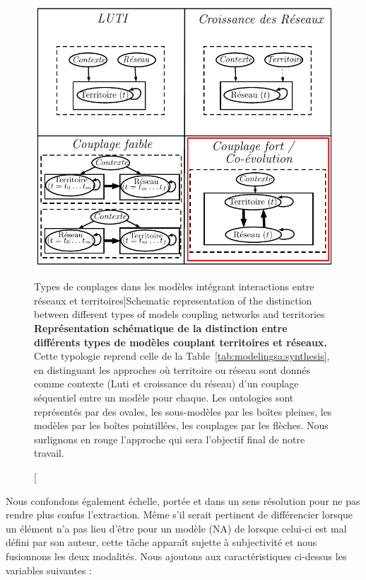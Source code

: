 \begin{figure}[h!]
\includegraphics[width=\linewidth]{Figures/Modelography/coevolution_fr.pdf}
\caption[Coupling types][Types de couplages dans les modèles intégrant interactions entre réseaux et territoires]{Schematic representation of the distinction between different types of models coupling networks and territories \label{fig:modelography:coevolution}}{\textbf{Représentation schématique de la distinction entre différents types de modèles couplant territoires et réseaux.} Cette typologie reprend celle de la Table~\ref{tab:modelingsa:synthesis}, en distinguant les approches où territoire ou réseau sont donnés comme contexte (Luti et croissance du réseau) d'un couplage séquentiel entre un modèle pour chaque. Les ontologies sont représentés par des ovales, les sous-modèles par les boîtes pleines, les modèles par les boîtes pointillées, les couplages par les flèches. Nous surlignons en rouge l'approche qui sera l'objectif final de notre travail.\label{fig:modelography:coevolution}}
\end{figure}

Nous confondons également échelle, portée et dans un sens résolution pour ne pas rendre plus confus l'extraction. Même s'il serait pertinent de différencier lorsque un élément n'a pas lieu d'être pour un modèle (NA) de lorsque celui-ci est mal défini par son auteur, cette tâche apparaît sujette à subjectivité et nous fusionnons les deux modalités. Nous ajoutons aux caractéristiques ci-dessus les variables suivantes :

